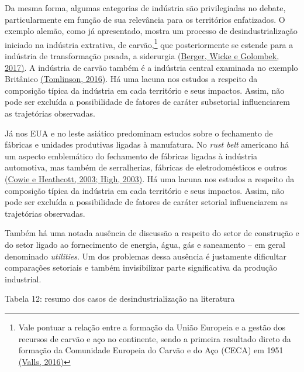 Da mesma forma, algumas categorias de indústria são privilegiadas no
debate, particularmente em função de sua relevância para os territórios
enfatizados. O exemplo alemão, como já apresentado, mostra um processo
de desindustrialização iniciado na indústria extrativa, de
carvão,\footnote{Vale pontuar a relação entre a formação da União
  Europeia e a gestão dos recursos de carvão e aço no continente, sendo
  a primeira resultado direto da formação da Comunidade Europeia do
  Carvão e do Aço (CECA) em 1951
  \href{https://www.zotero.org/google-docs/?L9vJ4c}{(Valls, 2016)}} que
posteriormente se estende para a indústria de transformação pesada, a
siderurgia \href{https://www.zotero.org/google-docs/?cCMYRz}{(Berger,
Wicke e Golombek, 2017)}. A indústria de carvão também é a indústria
central examinada no exemplo Britânico
\href{https://www.zotero.org/google-docs/?7lhlhr}{(Tomlinson, 2016)}. Há
uma lacuna nos estudos a respeito da composição típica da indústria em
cada território e seus impactos. Assim, não pode ser excluída a
possibilidade de fatores de caráter subsetorial influenciarem as
trajetórias observadas.

Já nos EUA e no leste asiático predominam estudos sobre o fechamento de
fábricas e unidades produtivas ligadas à manufatura. No \emph{rust belt}
americano há um aspecto emblemático do fechamento de fábricas ligadas à
indústria automotiva, mas também de serralherias, fábricas de
eletrodomésticos e outros
\href{https://www.zotero.org/google-docs/?Nb0AyK}{(Cowie e Heathcott,
2003; High, 2003)}. Há uma lacuna nos estudos a respeito da composição
típica da indústria em cada território e seus impactos. Assim, não pode
ser excluída a possibilidade de fatores de caráter setorial
influenciarem as trajetórias observadas.

Também há uma notada ausência de discussão a respeito do setor de
construção e do setor ligado ao fornecimento de energia, água, gás e
saneamento -- em geral denominado \emph{utilities}. Um dos problemas
dessa ausência é justamente dificultar comparações setoriais e também
invisibilizar parte significativa da produção industrial.

Tabela 12: resumo dos casos de desindustrialização na literatura

